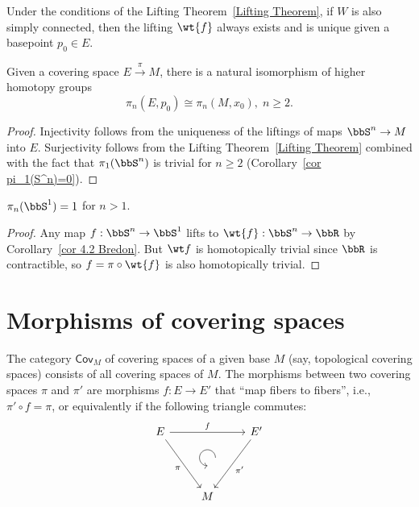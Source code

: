 \begin{cor}\label{cor 4.2 Bredon}
    Under the conditions of the Lifting Theorem~\ref{Lifting Theorem}, if $W$ is also simply connected, then the lifting $\wt{f}$ always exists and is unique given a basepoint $p_0\in E$.
\end{cor}

\begin{cor}\label{cor homotopy groups of coverings}
    Given a covering space $E\overset{\pi}{\to}M$, there is a natural isomorphism of higher homotopy groups
    \[\pi_n(E,p_0)\cong \pi_n(M,x_0),\; n\geq 2.\]
\end{cor}
\begin{proof}
    Injectivity follows from the uniqueness of the liftings of maps $\bbS^n\to M$ into $E$. Surjectivity follows from the Lifting Theorem~\ref{Lifting Theorem} combined with the fact that $\pi_1(\bbS^n)$ is trivial for $n\geq 2$ (Corollary~\ref{cor pi_1(S^n)=0}).
\end{proof}

\begin{cor}\label{cor: homotopy groups of circle}
    $\pi_n(\bbS^1)=1$ for $n>1$.
\end{cor}
\begin{proof}
    Any map $f:\bbS^n\to \bbS^1$ lifts to $\wt{f}:\bbS^n\to \bbR $ by Corollary~\ref{cor 4.2 Bredon}. But $\wt f$ is homotopically trivial since $\bbR $ is contractible, so $f=\pi\circ\wt{f}$ is also homotopically trivial.
\end{proof}


\section{Morphisms of covering spaces}


\begin{defn}
The category $\mathsf{Cov}_M$ of covering spaces of a given base $M$ (say, topological covering spaces) consists of all covering spaces of $M$. The morphisms between two covering spaces $\pi$ and $\pi'$ are morphisms $f:E\to E'$ that ``map fibers to fibers'', i.e., $\pi'\circ f=\pi$, or equivalently if the following triangle commutes:
\[
\begin{tikzcd}[every matrix/.append style={name=m},   
execute at end picture={\draw [<-] ([xshift=0mm,yshift=-2mm]m-2-2.north) arc[start angle=-90,delta angle=-270,radius=0.25cm];}]
   E \arrow[rr,"f"]\arrow[ddr,swap,"\pi"]& & E'\arrow[ddl,"\pi'"]\\
   & \, & \\
   & M & \\
\end{tikzcd}
\]
\end{defn}


